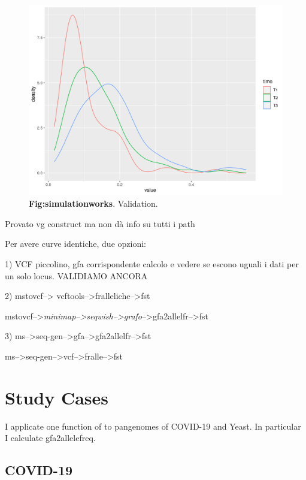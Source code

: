 \begin{figure}[H]
\centering
\includegraphics[width=1.00\textwidth]{fig/simulationworks.png}
\decoRule
\caption{\textbf{Fig:simulationworks}. 
Validation.}
\label{fig:simulationworks.pdf}
\end{figure}

Provato vg construct ma non dà info su tutti i path

Per avere curve identiche, due opzioni:

 
1) VCF piccolino, gfa corrispondente calcolo e vedere se escono uguali i dati per un solo locus. VALIDIAMO ANCORA  


2) mstovcf--> vcftools-->fralleliche-->fst


mstovcf-->\textit{minimap-->seqwish-->grafo}-->gfa2allelfr-->fst



3) ms-->seq-gen-->gfa-->gfa2allelfr-->fst

ms-->seq-gen-->vcf-->fralle-->fst




\section{Study Cases}

I applicate one function of \vgp to pangenomes of COVID-19 and Yeast. In particular I calculate gfa2allelefreq.

\subsection{COVID-19}

